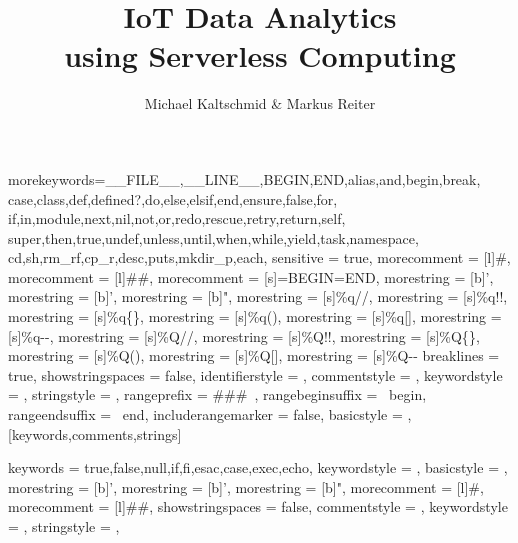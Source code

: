   {morekeywords={__FILE__,__LINE__,BEGIN,END,alias,and,begin,break,
  case,class,def,defined?,do,else,elsif,end,ensure,false,for,
  if,in,module,next,nil,not,or,redo,rescue,retry,return,self,
  super,then,true,undef,unless,until,when,while,yield,task,namespace,
  cd,sh,rm_rf,cp_r,desc,puts,mkdir_p,each},
  sensitive          = true,
  morecomment        = [l]\#,
  morecomment        = [l]\#\#,
  morecomment        = [s]{=BEGIN}{=END},
  morestring         = [b]',
  morestring         = [b]’,
  morestring         = [b]",
  morestring         = [s]{\%q/}{/},
  morestring         = [s]{\%q!}{!},
  morestring         = [s]{\%q\{}{\}},
  morestring         = [s]{\%q(}{)},
  morestring         = [s]{\%q[}{]},
  morestring         = [s]{\%q-}{-},
  morestring         = [s]{\%Q/}{/},
  morestring         = [s]{\%Q!}{!},
  morestring         = [s]{\%Q\{}{\}},
  morestring         = [s]{\%Q(}{)},
  morestring         = [s]{\%Q[}{]},
  morestring         = [s]{\%Q-}{-}
  breaklines         = true,
  showstringspaces   = false,
  identifierstyle    = \color{auburn},
  commentstyle       = \color{gray},
  keywordstyle       = \color{ceruleanblue},
  stringstyle        = \color{green(ncs)},
  rangeprefix        = \#\#\#\ ,
  rangebeginsuffix   = \ begin,
  rangeendsuffix     = \ end,
  includerangemarker = false,
  basicstyle         = \normalfont\ttfamily,
}[keywords,comments,strings]

 {
  keywords           = {true,false,null,if,fi,esac,case,exec,echo},
  keywordstyle       = \color{auburn},
  basicstyle         = \normalfont\ttfamily,
  morestring         = [b]',
  morestring         = [b]’,
  morestring         = [b]",
  morecomment        = [l]\#,
  morecomment        = [l]\#\#,
  showstringspaces   = false,
  commentstyle       = \color{red},
  keywordstyle       = \color{ceruleanblue},
  stringstyle        = \color{green(ncs)},
}

\newcommand{\whitelist}[1]{#1}

\title{IoT Data Analytics \\ using Serverless Computing}
\author{Michael Kaltschmid \& Markus Reiter}
\date{}
